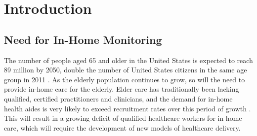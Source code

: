 \documentclass[12pt]{report}
\begin{document}
%
\begin{singlespace}
\tableofcontents
\listoffigures
\listoftables
\end{singlespace}
%


%
%
%
%
\newpage
\setcounter{page}{1}
\setlength{\parindent}{2em}

\chapter{Introduction}

\section{Need for In-Home Monitoring}
The number of people aged 65 and older in the United States is expected to reach 89 million by 2050, double the number of United States citizens in the same age group in 2011 \cite{Jacobsen2011AmericasPopulation}. As the elderly population continues to grow, so will the need to provide in-home care for the elderly. Elder care has traditionally been lacking qualified, certified practitioners and clinicians, and the demand for in-home health aides is very likely to exceed recruitment rates over this period of growth \cite{Rowe2016PreparingPopulation}. This will result in a growing deficit of qualified healthcare workers for in-home care, which will require the development of new models of healthcare delivery.
\end{document}
